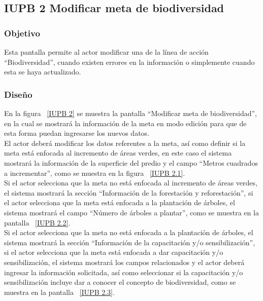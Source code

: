 \subsection{IUPB 2 Modificar meta de biodiversidad}
                     
\subsubsection{Objetivo}

   Esta pantalla permite al actor modificar una  de la línea de acción ``Biodiversidad'', cuando existen errores en la información o simplemente cuando esta se haya actualizado.

	
\subsubsection{Diseño}

  En la figura ~\ref{IUPB 2} se muestra la pantalla ``Modificar meta de biodiversidad'', en la cual se mostrará la información de la meta en modo edición para que
  de esta forma puedan ingresarse los nuevos datos.\\

  El actor deberá modificar los datos referentes a la meta, así como definir si la meta está enfocada al incremento de áreas verdes, 
  en este caso el sistema mostrará la información de la superficie del predio y el campo ``Metros cuadrados a incrementar'', como se muestra en la figura ~\ref{IUPB 2.1}.\\
  
  Si el actor selecciona que la meta no está enfocada al incremento de áreas verdes, el sistema mostrará la sección ``Información de la forestación y reforestación'',
  si el actor selecciona que la meta está enfocada a la plantación de árboles, el sistema mostrará el campo ``Número de árboles a plantar'', como se muestra en la pantalla ~\ref{IUPB 2.2}.\\
  
    
  Si el actor selecciona que la meta no está enfocada a la plantación de árboles, el sistema mostrará la sección ``Información de la capacitación y/o sensibilización'',
  si el actor selecciona que la meta está enfocada a dar capacitación y/o sensibilización, el sistema mostrará los campos relacionados y
  el actor deberá ingresar la información solicitada, así como seleccionar si la capacitación y/o sensibilización incluye dar a conocer
  el concepto de biodiversidad, como se muestra en la pantalla ~\ref{IUPB 2.3}.\\
    
